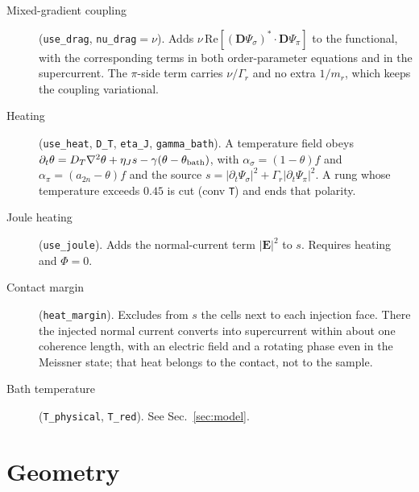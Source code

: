 \documentclass[11pt,a4paper]{article}
\newcommand{\code}[1]{\texttt{#1}}
\begin{document}
\begin{description}
\item[Mixed-gradient coupling] (\code{use\_drag}, \code{nu\_drag}$=\nu$).
  Adds $\nu\,\mathrm{Re}[(\mathbf D\Psi_\sigma)^*\cdot\mathbf D\Psi_\pi]$ to the
  functional, with the corresponding terms in both order-parameter
  equations and in the supercurrent. The $\pi$-side term carries
  $\nu/\Gamma_r$ and no extra $1/m_r$, which keeps the coupling variational.
\item[Heating] (\code{use\_heat}, \code{D\_T}, \code{eta\_J},
  \code{gamma\_bath}). A temperature field obeys
  $\partial_t\theta=D_T\nabla^2\theta+\eta_J s-\gamma(\theta-\theta_{\rm bath})$,
  with $\alpha_\sigma=(1-\theta)f$ and $\alpha_\pi=(a_{2n}-\theta)f$ and the
  source $s=|\partial_t\Psi_\sigma|^2+\Gamma_r|\partial_t\Psi_\pi|^2$. A rung
  whose temperature exceeds $0.45$ is cut (conv \code{T}) and ends that
  polarity.
\item[Joule heating] (\code{use\_joule}). Adds the normal-current term
  $|\mathbf E|^2$ to $s$. Requires heating and $\Phi=0$.
\item[Contact margin] (\code{heat\_margin}). Excludes from $s$ the cells
  next to each injection face. There the injected normal current converts
  into supercurrent within about one coherence length, with an electric
  field and a rotating phase even in the Meissner state; that heat belongs
  to the contact, not to the sample.
\item[Bath temperature] (\code{T\_physical}, \code{T\_red}). See
  Sec.~\ref{sec:model}.
\end{description}

\section{Geometry}
\end{document}
